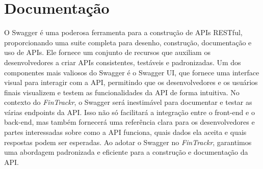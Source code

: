 \section{Documentação}
O Swagger é uma poderosa ferramenta para a construção de APIs RESTful, proporcionando uma suite completa para desenho, construção, documentação e uso de APIs. Ele fornece um conjunto de recursos que auxiliam os desenvolvedores a criar APIs consistentes, testáveis e padronizadas. Um dos componentes mais valiosos do Swagger é o Swagger UI, que fornece uma interface visual para interagir com a API, permitindo que os desenvolvedores e os usuários finais visualizem e testem as funcionalidades da API de forma intuitiva. No contexto do \textit{FinTrackr}, o Swagger será inestimável para documentar e testar as várias endpoints da API. Isso não só facilitará a integração entre o front-end e o back-end, mas também fornecerá uma referência clara para os desenvolvedores e partes interessadas sobre como a API funciona, quais dados ela aceita e quais respostas podem ser esperadas. Ao adotar o Swagger no \textit{FinTrackr}, garantimos uma abordagem padronizada e eficiente para a construção e documentação da API.
